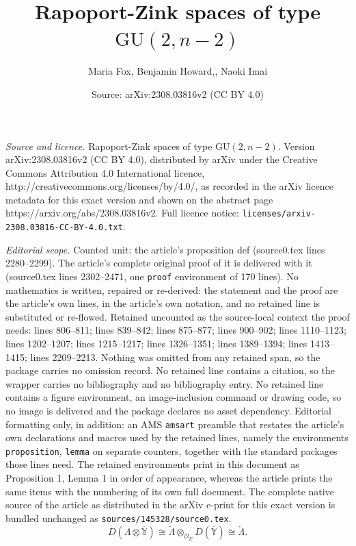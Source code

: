 \documentclass[10pt,a4paper]{amsart}
\title{Rapoport-Zink spaces of type $\mathrm{GU}(2,n-2)$}
\author{Maria Fox, Benjamin Howard,, Naoki Imai}
\date{Source: arXiv:2308.03816v2 (CC BY 4.0)}
\newcommand{\co}{\mathcal O}
\newcommand{\iso}{\cong}
\begin{document}
\maketitle

\noindent\emph{Source and licence.} Rapoport-Zink spaces of type $\mathrm{GU}(2,n-2)$. Version arXiv:2308.03816v2 (CC BY 4.0), distributed by arXiv under the Creative Commons Attribution 4.0 International licence, http://creativecommons.org/licenses/by/4.0/, as recorded in the arXiv licence metadata for this exact version and shown on the abstract page https://arxiv.org/abs/2308.03816v2. Full licence notice: \texttt{licenses/arxiv-2308.03816-CC-BY-4.0.txt}.\par\smallskip

\noindent\textit{Editorial scope.} Counted unit: the article's proposition def (source0.tex lines 2280--2299). The article's complete original proof of it is delivered with it (source0.tex lines 2302--2471, one \texttt{proof} environment of 170 lines). No mathematics is written, repaired or re-derived: the statement and the proof are the article's own lines, in the article's own notation, and no retained line is substituted or re-flowed.  Retained uncounted as the source-local context the proof needs: lines 806--811; lines 839--842; lines 875--877; lines 900--902; lines 1110--1123; lines 1202--1207; lines 1215--1217; lines 1326--1351; lines 1389--1394; lines 1413--1415; lines 2209--2213.  Nothing was omitted from any retained span, so the package carries no omission record.  No retained line contains a citation, so the wrapper carries no bibliography and no bibliography entry.  No retained line contains a figure environment, an image-inclusion command or drawing code, so no image is delivered and the package declares no asset dependency.  Editorial formatting only, in addition: an AMS \texttt{amsart} preamble that restates the article's own declarations and macros used by the retained lines, namely the environments \texttt{proposition}, \texttt{lemma} on separate counters, together with the standard packages those lines need.  The retained environments print in this document as Proposition 1, Lemma 1 in order of appearance, whereas the article prints the same items with the numbering of its own full document.  The complete native source of the article as distributed in the arXiv e-print for this exact version is bundled unchanged as \texttt{sources/145328/source0.tex}.
\begin{equation}\label{contraction}
D(\Lambda \otimes \overline{\mathbb{Y}})
\iso 
\breve{\Lambda} \otimes_{\co_{\breve{E}}} D(\overline{\mathbb{Y}}) 
\iso \breve{\Lambda}.
\end{equation}
\end{document}
